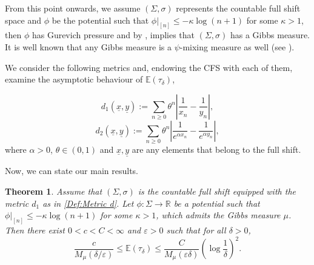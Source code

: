 \documentclass[11pt, reqno]{amsart}
\theoremstyle{plain}%
\newtheorem{theorem}{Theorem}[section]
\theoremstyle{definition}
\theoremstyle{definition}
\def\R{\ensuremath{\mathbb R}}
\def\E{\mathbb E}
\def\st{such that }
\def\ulx{\underline{x}}
\def\uly{\underline{y}}
\numberwithin{equation}{section}
\begin{document}
From this point onwards, we assume $(\Sigma,\sigma)$ represents the countable full shift space and $\phi$ be the potential \st $\phi\big|_{[n]}\le -\kappa\log (n+1)$ for some $\kappa>1$, then $\phi$ has Gurevich pressure and by \cite[Theorem 1]{Sarig2}, implies that $(\Sigma,\sigma)$ has a Gibbs measure. It is well known that any Gibbs measure is a $\psi$-mixing measure as well (see \cite[Lemma 2.4]{MelbournNicol05}). 

We consider the following metrics and, endowing the CFS with each of them, examine the asymptotic behaviour of $\E(\tau_\delta)$,

\begin{equation}\label{Def:Metric d}
d_1(\ulx,\underline{y}):=\sum_{n\ge 0} \theta^n \left| \frac{1}{x_n} - \frac{1}{y_n} \right|,\end{equation}
\begin{equation}\label{Def:Metric d_2}
    d_2(\ulx,\underline{y}):=\sum_{n\ge 0} \theta^n  \left| \frac{1}{e^{\alpha x_n}} - \frac{1}{e^{\alpha y_n}} \right|,
\end{equation}where $\alpha>0$, $\theta\in(0,1)$ and $\ulx,\uly$ are any elements that belong to the full shift.

Now, we can state our main results.
\begin{theorem}\label{Theorem: main theorem}
   Assume that $(\Sigma,\sigma)$ is the countable full shift equipped with the metric $d_1$ as in \eqref{Def:Metric d}. Let $\phi:\Sigma\to\R$ be a potential \st $\phi\big|_{[n]}\le -\kappa\log (n+1)$ for some $\kappa>1$, which admits the Gibbs measure  $\mu$. Then there exist $0<c<C<\infty$ and $\varepsilon>0$ such that for all $\delta>0$,
$$\frac{c}{M_\mu(\delta/\varepsilon)}\le\E(\tau_\delta)\le \frac{C}{M_\mu(\varepsilon\delta)}\left(\log\frac1{\delta}\right)^2. $$
\end{theorem}



\end{document}

